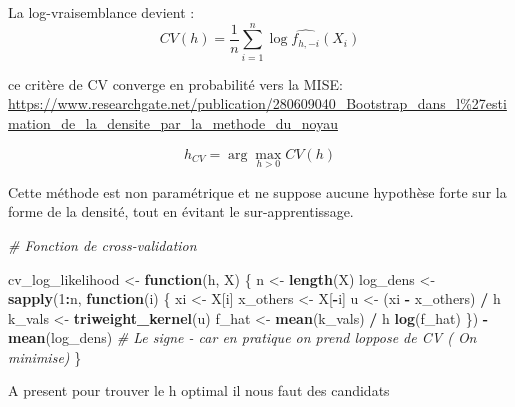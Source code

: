 \documentclass[
  12pt,
]{article}
\newenvironment{Shaded}{\begin{snugshade}}{\end{snugshade}}
\newcommand{\CommentTok}[1]{\textcolor[rgb]{0.56,0.35,0.01}{\textit{#1}}}
\newcommand{\ControlFlowTok}[1]{\textcolor[rgb]{0.13,0.29,0.53}{\textbf{#1}}}
\newcommand{\DecValTok}[1]{\textcolor[rgb]{0.00,0.00,0.81}{#1}}
\newcommand{\FunctionTok}[1]{\textcolor[rgb]{0.13,0.29,0.53}{\textbf{#1}}}
\newcommand{\NormalTok}[1]{#1}
\newcommand{\OtherTok}[1]{\textcolor[rgb]{0.56,0.35,0.01}{#1}}
\newcommand{\SpecialCharTok}[1]{\textcolor[rgb]{0.81,0.36,0.00}{\textbf{#1}}}
\begin{document}
La log-vraisemblance devient : \[
CV(h) = \frac{1}{n} \sum_{i=1}^n \log \hat{f_{h,-i}}(X_i)
\]

ce critère de CV converge en probabilité vers la MISE:
\url{https://www.researchgate.net/publication/280609040_Bootstrap_dans_l\%27estimation_de_la_densite_par_la_methode_du_noyau}

\[
{h}_{CV} = \arg\max_{h > 0} CV(h)
\]

Cette méthode est non paramétrique et ne suppose aucune hypothèse forte
sur la forme de la densité, tout en évitant le sur-apprentissage.

\begin{Shaded}
\begin{Highlighting}[]
\CommentTok{\# Fonction de cross{-}validation}

\NormalTok{cv\_log\_likelihood }\OtherTok{\textless{}{-}} \ControlFlowTok{function}\NormalTok{(h, X) \{}
\NormalTok{  n }\OtherTok{\textless{}{-}} \FunctionTok{length}\NormalTok{(X)}
\NormalTok{  log\_dens }\OtherTok{\textless{}{-}} \FunctionTok{sapply}\NormalTok{(}\DecValTok{1}\SpecialCharTok{:}\NormalTok{n, }\ControlFlowTok{function}\NormalTok{(i) \{}
\NormalTok{    xi }\OtherTok{\textless{}{-}}\NormalTok{ X[i]}
\NormalTok{    x\_others }\OtherTok{\textless{}{-}}\NormalTok{ X[}\SpecialCharTok{{-}}\NormalTok{i]}
\NormalTok{    u }\OtherTok{\textless{}{-}}\NormalTok{ (xi }\SpecialCharTok{{-}}\NormalTok{ x\_others) }\SpecialCharTok{/}\NormalTok{ h}
\NormalTok{    k\_vals }\OtherTok{\textless{}{-}} \FunctionTok{triweight\_kernel}\NormalTok{(u)}
\NormalTok{    f\_hat }\OtherTok{\textless{}{-}} \FunctionTok{mean}\NormalTok{(k\_vals) }\SpecialCharTok{/}\NormalTok{ h}
    \FunctionTok{log}\NormalTok{(f\_hat)}
\NormalTok{  \})}
  \SpecialCharTok{{-}}\FunctionTok{mean}\NormalTok{(log\_dens) }\CommentTok{\# Le signe {-} car en pratique on prend l\textquotesingle{}oppose de CV ( On minimise)}
\NormalTok{\}}
\end{Highlighting}
\end{Shaded}

A present pour trouver le h optimal il nous faut des candidats
\end{document}
